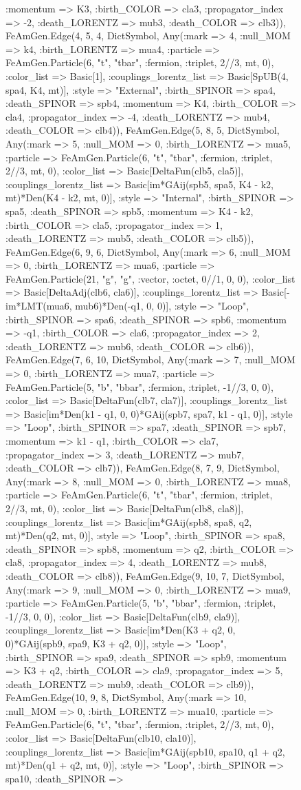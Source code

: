 \documentclass{revtex4}
\begin{document}
\begin{figure}[!htb]
\begin{center}
{:momentum => K3, :birth_COLOR => cla3, :propagator_index => -2, :death_LORENTZ => mub3, :death_COLOR => clb3)), FeAmGen.Edge(4, 5, 4, Dict{Symbol, Any}(:mark => 4, :null_MOM => k4, :birth_LORENTZ => mua4, :particle => FeAmGen.Particle(6, "t", "tbar", :fermion, :triplet, 2//3, mt, 0), :color_list => Basic[1], :couplings_lorentz_list => Basic[SpUB(4, spa4, K4, mt)], :style => "External", :birth_SPINOR => spa4, :death_SPINOR => spb4, :momentum => K4, :birth_COLOR => cla4, :propagator_index => -4, :death_LORENTZ => mub4, :death_COLOR => clb4)), FeAmGen.Edge(5, 8, 5, Dict{Symbol, Any}(:mark => 5, :null_MOM => 0, :birth_LORENTZ => mua5, :particle => FeAmGen.Particle(6, "t", "tbar", :fermion, :triplet, 2//3, mt, 0), :color_list => Basic[DeltaFun(clb5, cla5)], :couplings_lorentz_list => Basic[im*GAij(spb5, spa5, K4 - k2, mt)*Den(K4 - k2, mt, 0)], :style => "Internal", :birth_SPINOR => spa5, :death_SPINOR => spb5, :momentum => K4 - k2, :birth_COLOR => cla5, :propagator_index => 1, :death_LORENTZ => mub5, :death_COLOR => clb5)), FeAmGen.Edge(6, 9, 6, Dict{Symbol, Any}(:mark => 6, :null_MOM => 0, :birth_LORENTZ => mua6, :particle => FeAmGen.Particle(21, "g", "g", :vector, :octet, 0//1, 0, 0), :color_list => Basic[DeltaAdj(clb6, cla6)], :couplings_lorentz_list => Basic[-im*LMT(mua6, mub6)*Den(-q1, 0, 0)], :style => "Loop", :birth_SPINOR => spa6, :death_SPINOR => spb6, :momentum => -q1, :birth_COLOR => cla6, :propagator_index => 2, :death_LORENTZ => mub6, :death_COLOR => clb6)), FeAmGen.Edge(7, 6, 10, Dict{Symbol, Any}(:mark => 7, :null_MOM => 0, :birth_LORENTZ => mua7, :particle => FeAmGen.Particle(5, "b", "bbar", :fermion, :triplet, -1//3, 0, 0), :color_list => Basic[DeltaFun(clb7, cla7)], :couplings_lorentz_list => Basic[im*Den(k1 - q1, 0, 0)*GAij(spb7, spa7, k1 - q1, 0)], :style => "Loop", :birth_SPINOR => spa7, :death_SPINOR => spb7, :momentum => k1 - q1, :birth_COLOR => cla7, :propagator_index => 3, :death_LORENTZ => mub7, :death_COLOR => clb7)), FeAmGen.Edge(8, 7, 9, Dict{Symbol, Any}(:mark => 8, :null_MOM => 0, :birth_LORENTZ => mua8, :particle => FeAmGen.Particle(6, "t", "tbar", :fermion, :triplet, 2//3, mt, 0), :color_list => Basic[DeltaFun(clb8, cla8)], :couplings_lorentz_list => Basic[im*GAij(spb8, spa8, q2, mt)*Den(q2, mt, 0)], :style => "Loop", :birth_SPINOR => spa8, :death_SPINOR => spb8, :momentum => q2, :birth_COLOR => cla8, :propagator_index => 4, :death_LORENTZ => mub8, :death_COLOR => clb8)), FeAmGen.Edge(9, 10, 7, Dict{Symbol, Any}(:mark => 9, :null_MOM => 0, :birth_LORENTZ => mua9, :particle => FeAmGen.Particle(5, "b", "bbar", :fermion, :triplet, -1//3, 0, 0), :color_list => Basic[DeltaFun(clb9, cla9)], :couplings_lorentz_list => Basic[im*Den(K3 + q2, 0, 0)*GAij(spb9, spa9, K3 + q2, 0)], :style => "Loop", :birth_SPINOR => spa9, :death_SPINOR => spb9, :momentum => K3 + q2, :birth_COLOR => cla9, :propagator_index => 5, :death_LORENTZ => mub9, :death_COLOR => clb9)), FeAmGen.Edge(10, 9, 8, Dict{Symbol, Any}(:mark => 10, :null_MOM => 0, :birth_LORENTZ => mua10, :particle => FeAmGen.Particle(6, "t", "tbar", :fermion, :triplet, 2//3, mt, 0), :color_list => Basic[DeltaFun(clb10, cla10)], :couplings_lorentz_list => Basic[im*GAij(spb10, spa10, q1 + q2, mt)*Den(q1 + q2, mt, 0)], :style => "Loop", :birth_SPINOR => spa10, :death_SPINOR => }
\end{center}
\end{figure}
\end{document}
